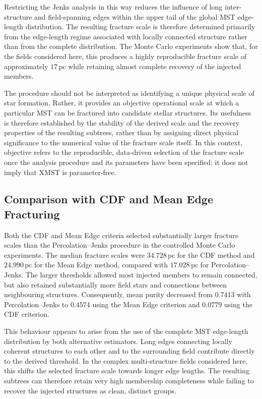\documentclass[fleqn,usenatbib]{mnras}
\begin{document}
Restricting the Jenks analysis in this way reduces the influence of long inter-structure and field-spanning edges within the upper tail of the global MST edge-length distribution. The resulting fracture scale is therefore determined primarily from the edge-length regime associated with locally connected structure rather than from the complete distribution. The Monte Carlo experiments show that, for the fields considered here, this produces a highly reproducible fracture scale of approximately $17\,\mathrm{pc}$ while retaining almost complete recovery of the injected members.

The procedure should not be interpreted as identifying a unique physical scale of star formation. Rather, it provides an objective operational scale at which a particular MST can be fractured into candidate stellar structures. Its usefulness is therefore established by the stability of the derived scale and the recovery properties of the resulting subtrees, rather than by assigning direct physical significance to the numerical value of the fracture scale itself. In this context, objective refers to the reproducible, data-driven selection of the fracture scale once the analysis procedure and its parameters have been specified; it does not imply that XMST is parameter-free.

\subsection{Comparison with CDF and Mean Edge Fracturing}

Both the CDF and Mean Edge criteria selected substantially larger fracture scales than the Percolation--Jenks procedure in the controlled Monte Carlo experiments. The median fracture scales were $34.728\,\mathrm{pc}$ for the CDF method and $24.990\,\mathrm{pc}$ for the Mean Edge method, compared with $17.028\,\mathrm{pc}$ for Percolation--Jenks. The larger thresholds allowed most injected members to remain connected, but also retained substantially more field stars and connections between neighbouring structures. Consequently, mean purity decreased from 0.7413 with Percolation--Jenks to 0.4574 using the Mean Edge criterion and 0.0779 using the CDF criterion.

This behaviour appears to arise from the use of the complete MST edge-length distribution by both alternative estimators. Long edges connecting locally coherent structures to each other and to the surrounding field contribute directly to the derived threshold. In the complex multi-structure fields considered here, this shifts the selected fracture scale towards longer edge lengths. The resulting subtrees can therefore retain very high membership completeness while failing to recover the injected structures as clean, distinct groups.
\end{document}
